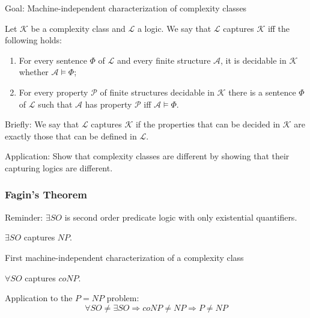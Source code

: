 \documentclass{beamer}
\renewcommand{\L}{\mathcal{L}}
\newcommand{\K}{\mathcal{K}}
\newcommand{\A}{\mathcal{A}}
\renewcommand{\P}{\mathcal{P}}
\begin{document}
\begin{frame}
	\titlepage
\end{frame}


\begin{frame}
	
	Goal: Machine-independent characterization of complexity classes
	\begin{definition}
		Let $\mathcal{K}$ be a complexity class and $\mathcal{L}$ a logic. We say that $\L$ captures $\K$ iff the following holds:
		\begin{enumerate}
			\item For every sentence $Φ$ of $\L$ and every finite structure $\A$, it is decidable in $\K$ whether $\A \vDash Φ$;
			\item For every property $\P$ of finite structures decidable in $\K$ there is a sentence $Φ$ of $\L$ such that $\A$ has property $\P$ iff $\A \vDash Φ$.
		\end{enumerate}
	\end{definition}
	
	\medskip
	
	Briefly: We say that $\L$ captures $\K$ if the properties that can be decided in $\K$ are exactly those that can be defined in $\L$.
	
	\medskip
	
	Application: Show that complexity classes are different by showing that their capturing logics are different.
\end{frame}

\begin{frame}
\frametitle{Fagin's Theorem}
Reminder: $\exists SO$ is second order predicate logic with only existential quantifiers.
  \begin{theorem}[Fagin]
    $∃SO$ captures $NP$.
  \end{theorem}
  First machine-independent characterization of a complexity class   
\end{frame}
\begin{frame}
 \begin{corollary}
  $\forall SO$ captures $coNP$.
 \end{corollary}
  Application to the $P = NP$ problem:
  \begin{equation*}
   \forall SO \neq \exists SO \Rightarrow coNP \neq NP \Rightarrow P \neq NP
  \end{equation*}

\end{frame}
\end{document}
